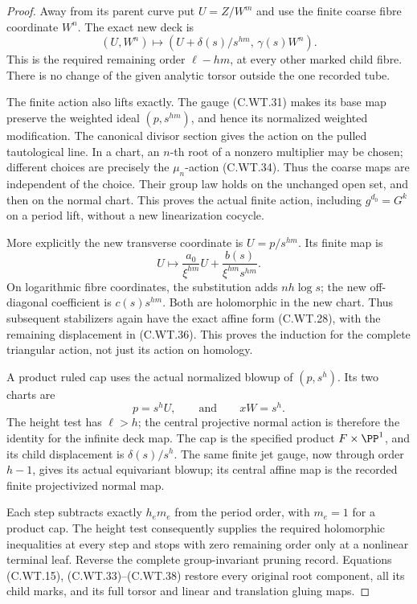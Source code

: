 \begin{proof}
Away from its parent curve put
\(U=Z/W^m\) and use the finite
coarse fibre coordinate \(W^n\).
The exact new deck is
\[
            (U,W^n)\longmapsto
            (U+\delta(s)/s^{hm},\,\gamma(s)W^n).
 \tag{C.WT.36}
\]
This is the required remaining
order \(\ell-hm\), at every
other marked child fibre.
There is no change of the
given analytic torsor outside
the one recorded tube.

The finite action also lifts
exactly. The gauge (C.WT.31)
makes its base map preserve
the weighted ideal
\((p,s^{hm})\), and hence its
normalized weighted modification.
The canonical divisor section
gives the action on the pulled
tautological line. In a chart,
an \(n\)-th root of a nonzero
multiplier may be chosen;
different choices are precisely
the \(\mu_n\)-action (C.WT.34).
Thus the coarse maps are
independent of the choice.
Their group law holds on the
unchanged open set, and then
on the normal chart. This
proves the actual finite action,
including \(g^{d_0}=G^k\)
on a period lift, without
a new linearization cocycle.

More explicitly the new
transverse coordinate is
\(U=p/s^{hm}\). Its finite
map is
\[
             U\longmapsto
       \frac{a_0}{\xi^{hm}}U
                 +\frac{b(s)}{\xi^{hm}s^{hm}} .
 \tag{C.WT.37}
\]
On logarithmic fibre coordinates,
the substitution adds \(nh\log s\);
the new off-diagonal coefficient
is \(c(s)s^{hm}\). Both are
holomorphic in the new chart.
Thus subsequent stabilizers
again have the exact affine
form (C.WT.28), with the
remaining displacement in
(C.WT.36). This proves the
induction for the complete
triangular action, not just
its action on homology.

A product ruled cap uses the
actual normalized blowup of
\((p,s^h)\). Its two charts are
\[
                  p=s^hU,\qquad\text{and}\qquad xW=s^h .
 \tag{C.WT.38}
\]
The height test has \(\ell>h\);
the central projective normal
action is therefore the identity
for the infinite deck map.
The cap is the specified
product \(F\times\PP^1\), and
its child displacement is
\(\delta(s)/s^h\).
The same finite jet gauge,
now through order \(h-1\),
gives its actual equivariant
blowup; its central affine
map is the recorded finite
projectivized normal map.

Each step subtracts exactly
\(h_em_e\) from the period
order, with \(m_e=1\) for
a product cap. The height
test consequently supplies
the required holomorphic
inequalities at every step
and stops with zero remaining
order only at a nonlinear
terminal leaf. Reverse the
complete group-invariant
pruning record. Equations
(C.WT.15), (C.WT.33)--(C.WT.38)
restore every original root
component, all its child marks,
and its full torsor and
linear and translation
gluing maps.


\end{proof}
